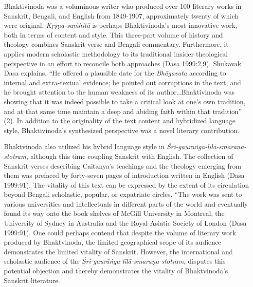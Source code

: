 Bhaktivinoda was a voluminous writer who produced over 100 literary works in Sanskrit, Bengali, and English from 1849-1907, approximately twenty of which were original. {\sl Kṛṣṇa-saṁhitā} is perhaps Bhaktivinoda’s most innovative work, both in terms of content and style. This three-part volume of history and theology combines Sanskrit verse and Bengali commentary. Furthermore, it applies modern scholastic methodology to its traditional insider theological perspective in an effort to reconcile both approaches (Dasa 1999:2,9). Shukavak Dasa explains, “He offered a plausible date for the {\sl Bhāgavata} according to internal and extra-textual evidence; he pointed out corruptions in the text, and he brought attention to the human weakness of its author…Bhaktivinoda was showing that it was indeed possible to take a critical look at one’s own tradition, and at that same time maintain a deep and abiding faith within that tradition” (2). In addition to the originality of the text content and hybridized language style, Bhaktivinoda’s synthesized perspective was a novel literary contribution. 
\vskip 2pt

Bhaktvinoda also utilized his hybrid language style in {\sl Śri-gaurāṅga-līlā-smaraṇa-stotram}, although this time coupling Sanskrit with English. The collection of Sanskrit verses describing Caitanya’s teachings and the theology emerging from them was prefaced by forty-seven pages of introduction written in English (Dasa 1999:91). The vitality of this text can be expressed by the extent of its circulation beyond Bengali scholastic, popular, or expatriate circles. “The work was sent to various universities and intellectuals in different parts of the world and eventually found its way onto the book shelves of McGill University in Montreal, the University of Sydney in Australia and the Royal Asiatic Society of London (Dasa 1999:91). One could perhaps contend that despite the volume of literary work produced by Bhaktvinoda, the limited geographical scope of its audience demonstrates the limited vitality of Sanskrit. However, the international and scholastic audience of the {\sl Śri-gaurāṅga-līlā-smaraṇa-stotram}, disputes this potential objection and thereby demonstrates the vitality of Bhaktvinoda’s Sanskrit literature. 
\vskip 2pt


